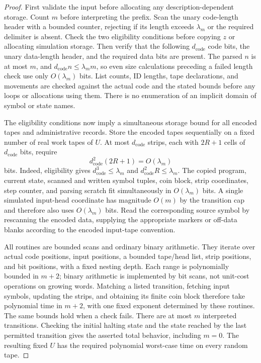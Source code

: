 \begin{proof}
First validate the input before allocating any description-dependent storage. Count $m$ before interpreting the prefix.  Scan the unary code-length
header with a bounded counter, rejecting if its length exceeds
$\lambda_m$ or the required delimiter is absent.  Check the two
eligibility conditions before copying $z$ or allocating simulation
storage.  Then verify that the following $d_{\mathrm{code}}$ code bits,
the unary data-length header, and the required data bits are present.
The parsed $n$ is at most $m$, and
$d_{\mathrm{code}}n\le\lambda_m m$, so even size calculations preceding
a failed length check use only $O(\lambda_m)$ bits.  List counts, ID
lengths, tape declarations, and movements are checked against the actual
code and the stated bounds before any loops or allocations using them.
There is no enumeration of an implicit domain of symbol or state names.

The eligibility conditions now imply a simultaneous storage bound for all encoded tapes and administrative records. Store the encoded tapes sequentially on a fixed number of real work
tapes of $U$.  At most $d_{\mathrm{code}}$ strips, each with $2R+1$
cells of $d_{\mathrm{code}}$ bits, require
\begin{equation}\label{eq:compiler-interpreter-space}
 d_{\mathrm{code}}^2(2R+1)=O(\lambda_m)
\end{equation}
bits.  Indeed, eligibility gives
$d_{\mathrm{code}}^3\le\lambda_m$ and
$d_{\mathrm{code}}^2R\le\lambda_m$.
The copied program, current state, scanned and written symbol tuples,
coin block, strip coordinates, step counter, and parsing scratch fit
simultaneously in $O(\lambda_m)$ bits.  A single simulated input-head
coordinate has magnitude $O(m)$ by the transition cap and therefore
also uses $O(\lambda_m)$ bits.  Read the corresponding source symbol
by rescanning the encoded data, supplying the appropriate markers or
off-data blanks according to the encoded input-tape convention.

All routines are bounded scans and ordinary binary arithmetic.  They
iterate over actual code positions, input positions, a bounded tape/head
list, strip positions, and bit positions, with a fixed nesting depth.
Each range is polynomially bounded in $m+2$; binary arithmetic is
implemented by bit scans, not unit-cost operations on growing words.
Matching a listed transition, fetching input symbols, updating the
strips, and obtaining its finite coin block therefore take polynomial
time in $m+2$, with one fixed exponent determined by these routines.
The same bounds hold when a check fails.  There are at most $m$
interpreted transitions.  Checking the initial halting state and the
state reached by the last permitted transition gives the asserted
total behavior, including $m=0$.  The resulting fixed $U$ has the
required polynomial worst-case time on every random tape.
\end{proof}

